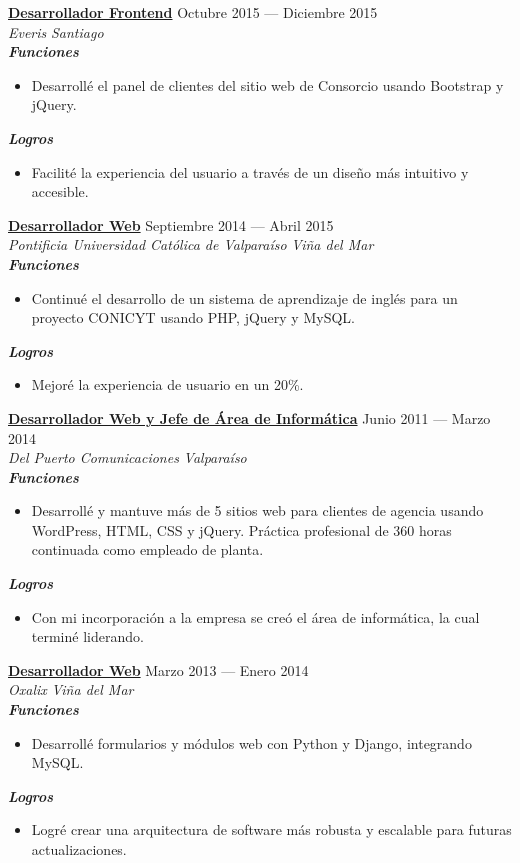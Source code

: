\documentclass[11pt,a4paper]{article}
\newcommand{\job}[4]{%
    \textbf{\underline{#1}} \hfill #2\\
    \textit{#3} \hfill \textit{#4}\\[2pt]
}
\newcommand{\newsubsection}[1]{
    \vspace{0em}
    \textbf{\textit{#1}}
    \vspace{0em}
}
\begin{document}
\job{Desarrollador Frontend}{Octubre 2015 --- Diciembre 2015}{Everis}{Santiago}

\newsubsection{Funciones}
\begin{itemize}[leftmargin=*, noitemsep, topsep=2pt]
    \item Desarrollé el panel de clientes del sitio web de Consorcio usando Bootstrap y jQuery.
\end{itemize}
\newsubsection{Logros}
\begin{itemize}[leftmargin=*, noitemsep, topsep=2pt]
    \item Facilité la experiencia del usuario a través de un diseño más intuitivo y accesible.
\end{itemize}


\job{Desarrollador Web}{Septiembre 2014 --- Abril 2015}{Pontificia Universidad Católica de Valparaíso}{Viña del Mar}
\newsubsection{Funciones}
\begin{itemize}[leftmargin=*, noitemsep, topsep=2pt]
    \item Continué el desarrollo de un sistema de aprendizaje de inglés para un proyecto CONICYT usando PHP, jQuery y MySQL.
\end{itemize}

\newsubsection{Logros}
\begin{itemize}[leftmargin=*, noitemsep, topsep=2pt]
    \item Mejoré la experiencia de usuario en un 20\%.
\end{itemize}

\job{Desarrollador Web y Jefe de Área de Informática}{Junio 2011 --- Marzo 2014}{Del Puerto Comunicaciones}{Valparaíso}
\newsubsection{Funciones}
\begin{itemize}[leftmargin=*, noitemsep, topsep=2pt]
    \item Desarrollé y mantuve más de 5 sitios web para clientes de agencia usando WordPress, HTML, CSS y jQuery. Práctica profesional de 360 horas continuada como empleado de planta.
    
\end{itemize}
\newsubsection{Logros}
\begin{itemize}[leftmargin=*, noitemsep, topsep=2pt]
    \item Con mi incorporación a la empresa se creó el área de informática, la cual terminé liderando.
\end{itemize}

\job{Desarrollador Web}{Marzo 2013 --- Enero 2014}{Oxalix}{Viña del Mar}
\newsubsection{Funciones}
\begin{itemize}[leftmargin=*, noitemsep, topsep=2pt]
    \item Desarrollé formularios y módulos web con Python y Django, integrando MySQL.
\end{itemize}
\newsubsection{Logros}
\begin{itemize}[leftmargin=*, noitemsep, topsep=2pt]
    \item Logré crear una arquitectura de software más robusta y escalable para futuras actualizaciones.
\end{itemize}
\end{document}
